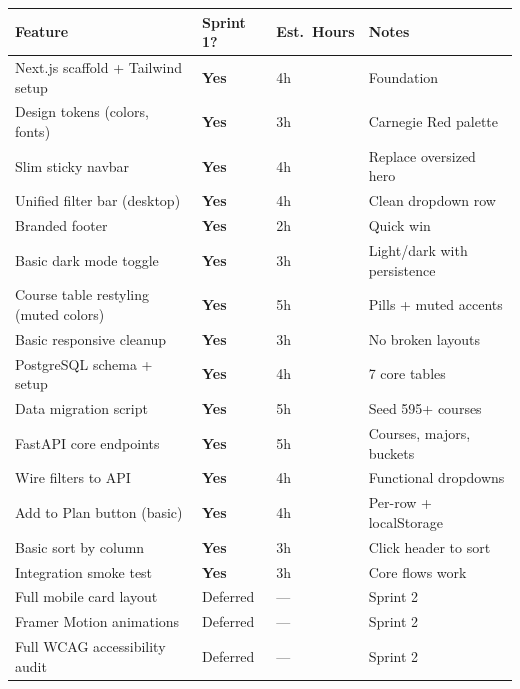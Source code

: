 \documentclass[11pt]{article}
\begin{document}
\begin{longtable}{p{} p{} p{} p{}}
\toprule
\textbf{Feature} & \textbf{Sprint 1?} & \textbf{Est.\ Hours} & \textbf{Notes} \\
\midrule
Next.js scaffold + Tailwind setup & \textcolor{green!60!black}{\textbf{Yes}} & 4h & Foundation \\
Design tokens (colors, fonts) & \textcolor{green!60!black}{\textbf{Yes}} & 3h & Carnegie Red palette \\
Slim sticky navbar & \textcolor{green!60!black}{\textbf{Yes}} & 4h & Replace oversized hero \\
Unified filter bar (desktop) & \textcolor{green!60!black}{\textbf{Yes}} & 4h & Clean dropdown row \\
Branded footer & \textcolor{green!60!black}{\textbf{Yes}} & 2h & Quick win \\
Basic dark mode toggle & \textcolor{green!60!black}{\textbf{Yes}} & 3h & Light/dark with persistence \\
Course table restyling (muted colors) & \textcolor{green!60!black}{\textbf{Yes}} & 5h & Pills + muted accents \\
Basic responsive cleanup & \textcolor{green!60!black}{\textbf{Yes}} & 3h & No broken layouts \\
PostgreSQL schema + setup & \textcolor{green!60!black}{\textbf{Yes}} & 4h & 7 core tables \\
Data migration script & \textcolor{green!60!black}{\textbf{Yes}} & 5h & Seed 595+ courses \\
FastAPI core endpoints & \textcolor{green!60!black}{\textbf{Yes}} & 5h & Courses, majors, buckets \\
Wire filters to API & \textcolor{green!60!black}{\textbf{Yes}} & 4h & Functional dropdowns \\
Add to Plan button (basic) & \textcolor{green!60!black}{\textbf{Yes}} & 4h & Per-row + localStorage \\
Basic sort by column & \textcolor{green!60!black}{\textbf{Yes}} & 3h & Click header to sort \\
Integration smoke test & \textcolor{green!60!black}{\textbf{Yes}} & 3h & Core flows work \\
\midrule
\rowcolor{deferGray}
Full mobile card layout & Deferred & --- & Sprint 2 \\
\rowcolor{deferGray}
Framer Motion animations & Deferred & --- & Sprint 2 \\
\rowcolor{deferGray}
Full WCAG accessibility audit & Deferred & --- & Sprint 2 \\

\end{longtable}
\end{document}
